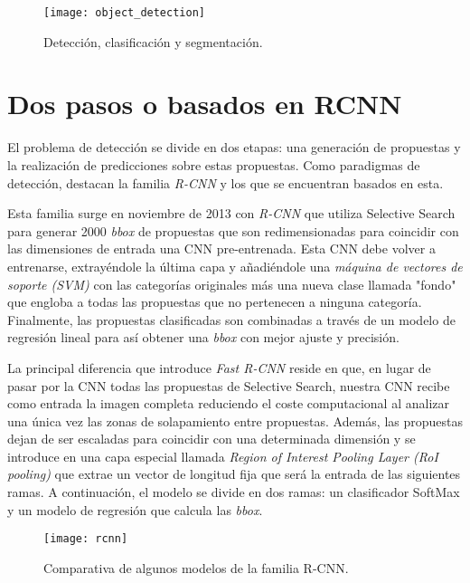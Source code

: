 \begin{figure}[htpb]
  \centering
  \texttt{[image: object\_detection]}
  \caption{Detección, clasificación y segmentación. \cite{2019arXiv190803673W}}
  \label{fig:object-detection}
\end{figure}



\section{Dos pasos o basados en RCNN}
El problema de detección se divide en dos etapas: una generación de propuestas y la realización de predicciones sobre estas propuestas. Como paradigmas de detección, destacan la familia \emph{R-CNN} y los que se encuentran basados en esta.\newline

Esta familia surge en noviembre de 2013 con \emph{R-CNN} \cite{2013arXiv1311.2524G} que utiliza Selective Search \cite{Selective Search for object recognition} para generar 2000 \emph{bbox} de propuestas que son redimensionadas para coincidir con las dimensiones de entrada una CNN pre-entrenada. Esta CNN debe volver a entrenarse, extrayéndole la última capa y añadiéndole una \emph{máquina de vectores de soporte (SVM)} con las categorías originales más una nueva clase llamada "fondo" que engloba a todas las propuestas que no pertenecen a ninguna categoría. Finalmente, las propuestas clasificadas son combinadas a través de un modelo de regresión lineal para así obtener una \emph{bbox} con mejor ajuste y precisión.\newline

La principal diferencia que introduce \emph{Fast R-CNN} \cite{2015arXiv150408083G} reside en que, en lugar de pasar por la CNN todas las propuestas de Selective Search, nuestra CNN recibe como entrada la imagen completa reduciendo el coste computacional al analizar una única vez las zonas de solapamiento entre propuestas. Además, las propuestas dejan de ser escaladas para coincidir con una determinada dimensión y se introduce en una capa especial llamada \emph{Region of Interest Pooling Layer (RoI pooling)} que extrae un vector de longitud fija que será la entrada de las siguientes ramas. A continuación, el modelo se divide en dos ramas: un clasificador SoftMax y un modelo de regresión que calcula las \emph{bbox}. \newline

\begin{figure}[htpb]
  \centering
  \texttt{[image: rcnn]}
  \caption{Comparativa de algunos modelos de la familia R-CNN. \cite{2019arXiv190803673W}}
  \label{fig:r-cnn}
\end{figure}

